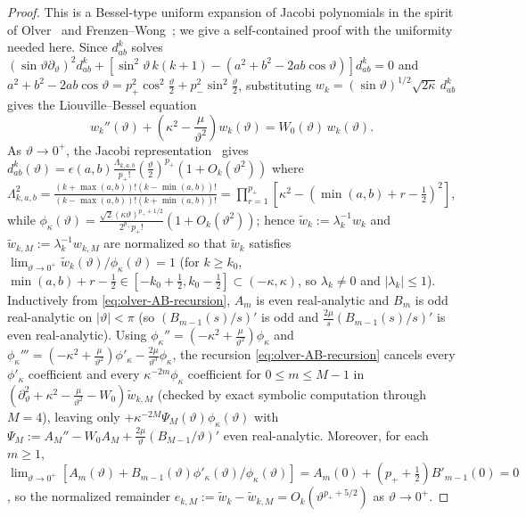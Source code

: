 \documentclass[11pt]{article}
\theoremstyle{definition}
\theoremstyle{remark}
\renewcommand{\_}{\oldunderscore\penalty0\hskip0pt\relax}
\begin{document}
\begin{proof}
This is a Bessel-type uniform expansion of Jacobi polynomials in the spirit of Olver~\cite[Ch.~12]{OlverASF} and Frenzen--Wong~\cite{FrenzenWong}; we give a self-contained proof with the uniformity needed here.  Since $d^k_{ab}$ solves $(\sin\vartheta\partial_\vartheta)^2
  d^k_{ab}+[\sin^2\vartheta\,k(k+1)-(a^2+b^2-2ab\cos\vartheta)]d^k_{ab}=0$ and
  $a^2+b^2-2ab\cos\vartheta=p_+^2\cos^2\frac{\vartheta}{2}+p_-^2\sin^2\frac{\vartheta}{2}$, substituting
  $w_k=(\sin\vartheta)^{1/2}\sqrt{2\kappa}\,d^k_{ab}$ gives the Liouville--Bessel equation
\begin{equation}
  w_k''(\vartheta) + \left(\kappa^2 - \frac{\mu}{\vartheta^2}\right)w_k(\vartheta) = W_0(\vartheta)\,w_k(\vartheta).
  \label{eq:wk-liouville-bessel}
\end{equation}
As $\vartheta\to 0^+$, the Jacobi representation~\cite[Eq.~(68)]{LewisFixedRank} gives
  $d^k_{ab}(\vartheta)=\epsilon(a,b)\frac{\Lambda_{k,a,b}}{p_+!}(\frac{\vartheta}{2})^{p_+}(1+O_k(\vartheta^2))$ where
  $\Lambda_{k,a,b}^2=\frac{(k+\max(a,b))!(k-\min(a,b))!}{(k-\max(a,b))!(k+\min(a,b))!}=\prod_{r=1}^{p_+}[\kappa^2-(\min(a,b)+r-\frac12)^2]$,
  while $\phi_\kappa(\vartheta)=\frac{\sqrt{2}(\kappa\vartheta)^{p_++1/2}}{2^{p_+}p_+!}(1+O_k(\vartheta^2))$; hence
  $\widetilde{w}_k:=\lambda_k^{-1}w_k$ and $\widetilde{w}_{k,M}:=\lambda_k^{-1}w_{k,M}$ are normalized so that $\widetilde{w}_k$
  satisfies $\lim_{\vartheta\to 0^+}\widetilde{w}_k(\vartheta)/\phi_\kappa(\vartheta)=1$ (for $k\ge k_0$,
  $\min(a,b)+r-\frac12\in[-k_0+\frac12,k_0-\frac12]\subset(-\kappa,\kappa)$, so $\lambda_k\ne 0$ and $|\lambda_k|\le 1$).
  Inductively from \eqref{eq:olver-AB-recursion}, $A_m$ is even real-analytic and $B_m$ is odd real-analytic on $|\vartheta|<\pi$
  (so $(B_{m-1}(s)/s)'$ is odd and $\frac{2\mu}{s}(B_{m-1}(s)/s)'$ is even real-analytic). Using
  $\phi_\kappa''=(-\kappa^2+\frac{\mu}{\vartheta^2})\phi_\kappa$ and
  $\phi_\kappa'''=(-\kappa^2+\frac{\mu}{\vartheta^2})\phi'_\kappa-\frac{2\mu}{\vartheta^3}\phi_\kappa$, the recursion
  \eqref{eq:olver-AB-recursion} cancels every $\phi'_\kappa$ coefficient and every $\kappa^{-2m}\phi_\kappa$ coefficient for
  $0\le m\le M-1$ in $(\partial_\vartheta^2+\kappa^2-\frac{\mu}{\vartheta^2}-W_0)\widetilde{w}_{k,M}$ (checked by exact symbolic computation
  through $M=4$), leaving only
  $+\kappa^{-2M}\Psi_M(\vartheta)\phi_\kappa(\vartheta)$ with $\Psi_M:=A_M''-W_0 A_M+\frac{2\mu}{\vartheta}(B_{M-1}/\vartheta)'$
  even real-analytic. Moreover, for each $m\ge 1$, $\lim_{\vartheta\to
  0^+}[A_m(\vartheta)+B_{m-1}(\vartheta)\phi'_\kappa(\vartheta)/\phi_\kappa(\vartheta)]=A_m(0)+(p_++\frac12)B'_{m-1}(0)=0$, so
  the normalized remainder $e_{k,M}:=\widetilde{w}_k-\widetilde{w}_{k,M}=O_k(\vartheta^{p_++5/2})$ as $\vartheta\to 0^+$.


\end{proof}
\end{document}
